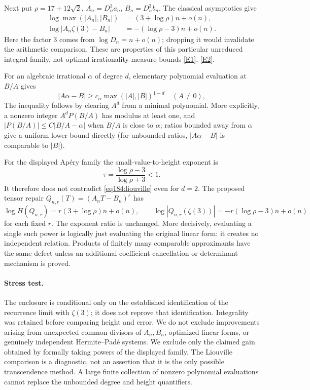 \documentclass[11pt,a4paper]{article}
\newcommand{\eref}[2]{\hyperlink{extra:#1:#2}{[E#2]}}
\numberwithin{equation}{section}
\begin{document}
Next put $\rho=17+12\sqrt2$, $A_n=D_n^3a_n$, $B_n=D_n^3b_n$. The classical asymptotics give
\begin{align*}
 \log\max(|A_n|,|B_n|)&=(3+\log\rho)n+o(n),\\
 \log|A_n\zeta(3)-B_n|&=-(\log\rho-3)n+o(n).
\end{align*}
Here the factor $3$ comes from $\log D_n=n+o(n)$; dropping it would invalidate the arithmetic comparison. These are properties of this particular unreduced integral family, not optimal irrationality-measure bounds \eref{184}{1}, \eref{184}{2}.

For an algebraic irrational $\alpha$ of degree $d$, elementary polynomial evaluation at $B/A$ gives
\begin{equation}\label{eq184:liouville}
 |A\alpha-B|\ge c_\alpha\max(|A|,|B|)^{1-d}
 \quad(A\ne0),
\end{equation}
The inequality follows by clearing $A^d$ from a minimal polynomial. More explicitly, a nonzero integer $A^dP(B/A)$ has modulus at least one, and $|P(B/A)|\le C|B/A-\alpha|$ when $B/A$ is close to $\alpha$; ratios bounded away from $\alpha$ give a uniform lower bound directly (for unbounded ratios, $|A\alpha-B|$ is comparable to $|B|$).

For the displayed Ap\'ery family the small-value-to-height exponent is
\[
 \tau=\frac{\log\rho-3}{\log\rho+3}<1.
\]
It therefore does not contradict \eqref{eq184:liouville} even for $d=2$. The proposed tensor repair $Q_{n,r}(T)=(A_nT-B_n)^r$ has
\[
 \log H(Q_{n,r})=r(3+\log\rho)n+o(n),\qquad
 \log|Q_{n,r}(\zeta(3))|=-r(\log\rho-3)n+o(n)
\]
for each fixed $r$. The exponent ratio is unchanged. More decisively, evaluating a single such power is logically just evaluating the original linear form: it creates no independent relation. Products of finitely many comparable approximants have the same defect unless an additional coefficient-cancellation or determinant mechanism is proved.

\paragraph{Stress test.}
The enclosure is conditional only on the established identification of the recurrence limit with $\zeta(3)$; it does not reprove that identification. Integrality was retained before comparing height and error. We do not exclude improvements arising from unexpected common divisors of $A_n,B_n$, optimized linear forms, or genuinely independent Hermite--Pad\'e systems. We exclude only the claimed gain obtained by formally taking powers of the displayed family. The Liouville comparison is a diagnostic, not an assertion that it is the only possible transcendence method. A large finite collection of nonzero polynomial evaluations cannot replace the unbounded degree and height quantifiers.
\end{document}
